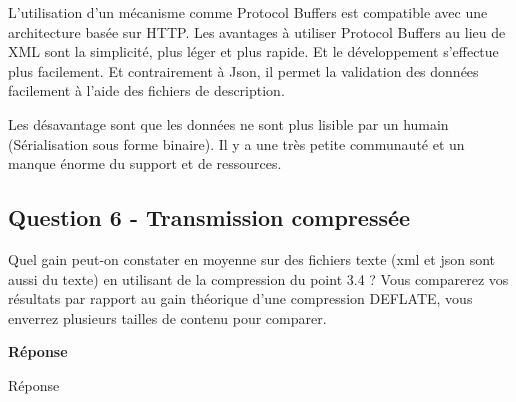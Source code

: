 \documentclass[francais,12pt]{article}
\begin{document}
    L'utilisation d'un mécanisme comme Protocol Buffers est compatible avec une architecture basée sur HTTP. Les avantages à utiliser Protocol Buffers au lieu de XML sont la simplicité, plus léger et plus rapide. Et le développement s'effectue plus facilement. Et contrairement à Json, il permet la validation des données facilement à l'aide des fichiers de description.
    
    Les désavantage sont que les données ne sont plus lisible par un humain (Sérialisation sous forme binaire). Il y a une très petite communauté et un manque énorme du support et de ressources.
	
	\subsection*{Question 6 - Transmission compressée}
	Quel gain peut-on constater en moyenne sur des fichiers texte (xml et json sont aussi du texte) en utilisant de la compression du point 3.4 ? Vous comparerez vos résultats par rapport au gain théorique d'une compression DEFLATE, vous enverrez plusieurs tailles de contenu pour comparer.
	
	{\color[rgb]{0,0.5,0.23}\textbf{Réponse}}
	
	Réponse
	
	
\end{document}
